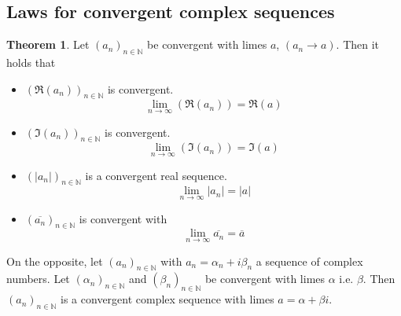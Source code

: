 \documentclass[a4paper,landscape,twocolumn]{article}
\theoremstyle{definition}
\newtheorem{theorem}{Theorem}
\newcommand\abs[1]{\left|#1\right|}
\newcommand\seq[1]{{\left(#1\right)}_{n \in \mathbb N}}
\begin{document}
\subsection{Laws for convergent complex sequences}
%
\begin{theorem}
  Let $(a_n)_{n \in \mathbb N}$ be convergent with limes $a$, $(a_n \to a)$. Then it holds that
  \begin{itemize}
    \item $\left(\Re(a_n)\right)_{n \in \mathbb N}$ is convergent.
      \[ \lim_{n \to \infty} \left(\Re(a_n)\right) = \Re(a) \]
    \item $\left(\Im(a_n)\right)_{n \in \mathbb N}$ is convergent.
      \[ \lim_{n \to \infty} \left(\Im(a_n)\right) = \Im(a) \]
    \item $\left(\abs{a_n}\right)_{n \in \mathbb N}$ is a convergent real sequence.
      \[ \lim_{n \to \infty} \abs{a_n} = \abs{a} \]
    \item $\left(\overline{a_n}\right)_{n \in \mathbb N}$ is convergent with
      \[ \lim_{n \to \infty} \overline{a_n} = \overline{a} \]
  \end{itemize}

  On the opposite, let $\seq{a_n}$ with $a_n = \alpha_n + i \beta_n$ a sequence of complex numbers.
  Let $\seq{\alpha_n}$ and $\seq{\beta_n}$ be convergent with limes $\alpha$ i.e. $\beta$.
  Then $\seq{a_n}$ is a convergent complex sequence with limes $a = \alpha+\beta i$.
\end{theorem}
\end{document}

